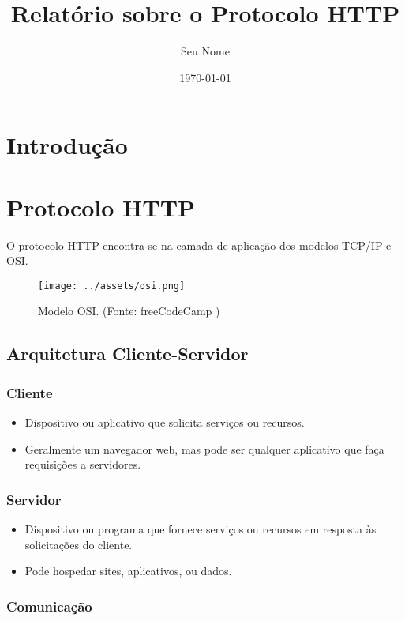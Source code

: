\documentclass{article}
\title{Relatório sobre o Protocolo HTTP}
\author{Seu Nome}
\date{\today}
\begin{document}
\maketitle

\section{Introdução}

\section{Protocolo HTTP}

O protocolo HTTP encontra-se na camada de aplicação dos modelos TCP/IP e OSI.

\begin{figure}[h]
    \centering
    \texttt{[image: ../assets/osi.png]}
    \caption{Modelo OSI. (Fonte: freeCodeCamp \cite{freecodecamp})}
\end{figure}

\subsection{Arquitetura Cliente-Servidor}

\subsubsection{Cliente}

\begin{itemize}
    \item Dispositivo ou aplicativo que solicita serviços ou recursos.
    \item Geralmente um navegador web, mas pode ser qualquer aplicativo que faça requisições a servidores.
\end{itemize}

\subsubsection{Servidor}

\begin{itemize}
    \item Dispositivo ou programa que fornece serviços ou recursos em resposta às solicitações do cliente.
    \item Pode hospedar sites, aplicativos, ou dados.
\end{itemize}

\subsubsection{Comunicação}
\end{document}
